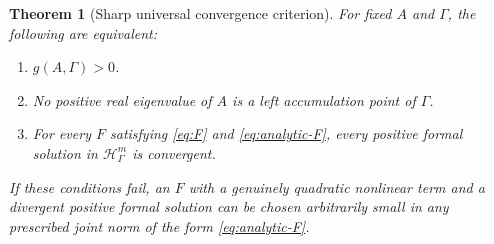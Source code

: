 \documentclass[11pt,a4paper]{article}
\numberwithin{equation}{section}
\newtheorem{theorem}{Theorem}[section]
\theoremstyle{definition}
\theoremstyle{remark}
\newcommand{\G}{\Gamma}
\newcommand{\HH}{\mathscr H}
\begin{document}
\begin{theorem}[Sharp universal convergence criterion]\label{thm:gap}
For fixed $A$ and $\G$, the following are equivalent:
\begin{enumerate}
\item $g(A,\G)>0$.
\item No positive real eigenvalue of $A$ is a left accumulation point of
$\G$.
\item For every $F$ satisfying \eqref{eq:F} and \eqref{eq:analytic-F},
every positive formal solution in $\HH_\G^m$ is convergent.
\end{enumerate}
If these conditions fail, an $F$ with a genuinely quadratic nonlinear
term and a divergent positive formal solution can be chosen arbitrarily
small in any prescribed joint norm of the form
\eqref{eq:analytic-F}.
\end{theorem}
\end{document}
